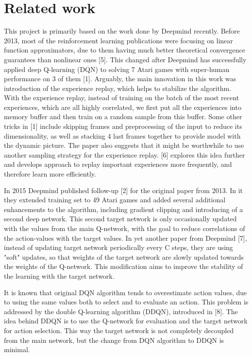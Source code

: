 \documentclass{article}
\begin{document}
\section{Related work}
This project is primarily based on the work done by Deepmind recently. Before 2013, most of the reinforcement learning publications were focusing on linear function approximators, due to them having much better theoretical convergence guarantees than nonlinear ones [5]. This changed after Deepmind has successfully applied deep Q-learning (DQN) to solving 7 Atari games with super-human performance on 3 of them [1]. Arguably, the main innovation in this work was introduction of the experience replay, which helps to stabilize the algorithm. With the experience replay, instead of training on the batch of the most recent experiences, which are all highly correlated, we first put all the experiences into memory buffer and then train on a random sample from this buffer. Some other tricks in [1] include skipping frames and preprocessing of the input to reduce its dimensionality, as well as stacking 4 last frames together to provide model with the dynamic picture. The paper also suggests that it might be worthwhile to use another sampling strategy for the experience replay. [6] explores this idea further and develops approach to replay important experiences more frequently, and therefore learn more efficiently.

    In 2015 Deepmind published follow-up [2] for the original paper from 2013. In it they extended training set to 49 Atari games and added several additional enhancements to the algorithm, including gradient clipping and introducing of a second deep network. This second target network is only occasionally updated with the values from the main Q-network, with the goal to reduce correlations of the action-values with the target values. In yet another paper from Deepmind [7], instead of updating target network periodically every C steps, they are using "soft" updates, so that weights of the target network are slowly updated towards the weights of the Q-network. This modification aims to improve the stability of the learning with the target network.

    It is known that original DQN algorithm tends to overestimate action values, due to using the same values both to select and to evaluate an action. This problem is addressed by the double Q-learning algorithm (DDQN), introduced in [8]. The idea behind DDQN is to use the Q-network for evaluation and the target network for action selection. This way the target network is not completely decoupled from the main network, but the change from DQN algorithm to DDQN is minimal.
    
\end{document}
